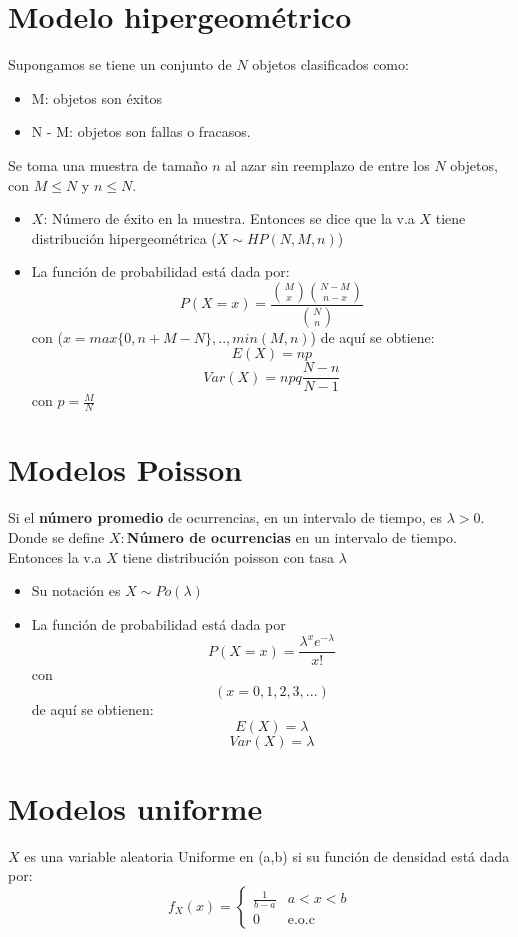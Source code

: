 \documentclass[12pt,twocolumn,a4paper]{report}
\begin{document}
\section*{Modelo hipergeométrico}
Supongamos se tiene un conjunto de $N$ objetos clasificados como: 
\begin{itemize}
\item{M: objetos son éxitos}
\item{N - M: objetos son fallas o fracasos.}
\end{itemize}
Se toma una muestra de tamaño $n$ al azar sin reemplazo de entre los $N$ objetos, con $M \leq N$ y $n \leq N$.
\begin{itemize}
\setlength\itemsep{0.001cm}
\item{$X$: Número de éxito en la muestra. Entonces se dice que la v.a $X$ tiene distribución hipergeométrica ($X \sim HP(N,M,n)$)}
\item{La función de probabilidad está dada por: 
$$
P(X= x) = \frac{\binom{M}{x}\binom{N-M}{n-x}}{\binom{N}{n}}
$$
con ($x = max\{ 0,n+M-N\},.., min(M,n)$) de aquí se obtiene:
$$
E(X) =np
$$
$$
Var(X) = npq \frac{N-n}{N-1}
$$}
con $ p = \frac{M}{N}$
\end{itemize}
 
\section*{Modelos Poisson}
Si el \textbf{número promedio} de ocurrencias, en un intervalo de tiempo, es $\lambda > 0$. Donde se define $X:$\textbf{Número de ocurrencias} en un intervalo de tiempo. Entonces la v.a $X$ tiene distribución poisson con tasa $\lambda$
\begin{itemize}
\setlength\itemsep{0.001cm}
\item{Su notación es $X \sim Po(\lambda)$}
\item{La función de probabilidad está dada por
$$
P(X= x) = \frac{\lambda^x e^{-\lambda}}{x!}
$$
con
$$
(x = 0,1,2,3,...)
$$
de aquí se obtienen:
$$
E(X) = \lambda
$$
$$
Var(X) = \lambda
$$}

\end{itemize}

\section*{Modelos uniforme}
$X$ es una variable aleatoria Uniforme en (a,b) si su función de densidad está dada por:
\begin{equation*}
f_X(x)= \left\{ \begin{array}{lc}
             \frac{1}{b-a} & a < x < b \\
             0			   & \text{e.o.c} 
             \end{array}
   \right.
\end{equation*}
\end{document}
